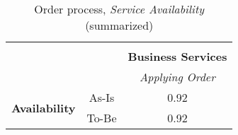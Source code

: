\begin{table}[H]
\begin{tabular}{|c|c|p{2cm}|p{2.5cm}|p{2.5cm}|p{2.5cm}|}
		\multicolumn{6}{c}{} \\ \cline{3-6}
		\multicolumn{2}{c}{} & \multicolumn{4}{|c|}{\textbf{Business Services}} \\ \cline{3-6}
		\multicolumn{2}{c|}{} &  \multicolumn{4}{c|}{\textsl{Applying Order}}  \\
		\hline
		\multirow{2}{*}{\textbf{Availability}} & As-Is & \multicolumn{4}{c|}{0.92}\\ \cline{2-6}
		& To-Be & \multicolumn{4}{c|}{0.92} \\ \hline
	\end{tabular}
\caption{Order process, \textsl{Service Availability} (summarized)} 
\label{tab:order_availability_both}
\end{table}